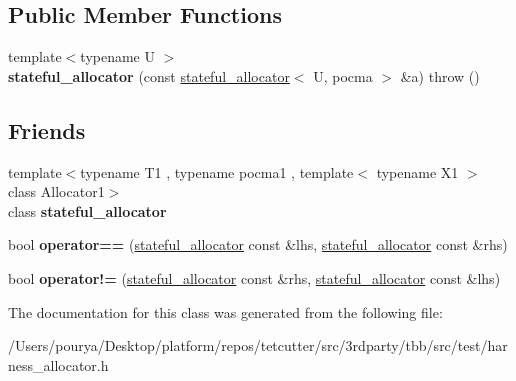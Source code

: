 \subsection*{Public Member Functions}
\begin{DoxyCompactItemize}
\item 
\hypertarget{classstateful__allocator_a275728a9f0d8ab2a0da3e09c03fb87cc}{}{\footnotesize template$<$typename U $>$ }\\{\bfseries stateful\+\_\+allocator} (const \hyperlink{classstateful__allocator}{stateful\+\_\+allocator}$<$ U, pocma $>$ \&a)  throw ()\label{classstateful__allocator_a275728a9f0d8ab2a0da3e09c03fb87cc}

\end{DoxyCompactItemize}
\subsection*{Friends}
\begin{DoxyCompactItemize}
\item 
\hypertarget{classstateful__allocator_aeed30f0675b482e457d1371de15de924}{}{\footnotesize template$<$typename T1 , typename pocma1 , template$<$ typename X1 $>$ class Allocator1$>$ }\\class {\bfseries stateful\+\_\+allocator}\label{classstateful__allocator_aeed30f0675b482e457d1371de15de924}

\item 
\hypertarget{classstateful__allocator_a23d21b6517fadbc7c2bf41f65a03627c}{}bool {\bfseries operator==} (\hyperlink{classstateful__allocator}{stateful\+\_\+allocator} const \&lhs, \hyperlink{classstateful__allocator}{stateful\+\_\+allocator} const \&rhs)\label{classstateful__allocator_a23d21b6517fadbc7c2bf41f65a03627c}

\item 
\hypertarget{classstateful__allocator_a84f52e45159e52b563f50d26b4d91f88}{}bool {\bfseries operator!=} (\hyperlink{classstateful__allocator}{stateful\+\_\+allocator} const \&rhs, \hyperlink{classstateful__allocator}{stateful\+\_\+allocator} const \&lhs)\label{classstateful__allocator_a84f52e45159e52b563f50d26b4d91f88}

\end{DoxyCompactItemize}


The documentation for this class was generated from the following file\+:\begin{DoxyCompactItemize}
\item 
/\+Users/pourya/\+Desktop/platform/repos/tetcutter/src/3rdparty/tbb/src/test/harness\+\_\+allocator.\+h\end{DoxyCompactItemize}

